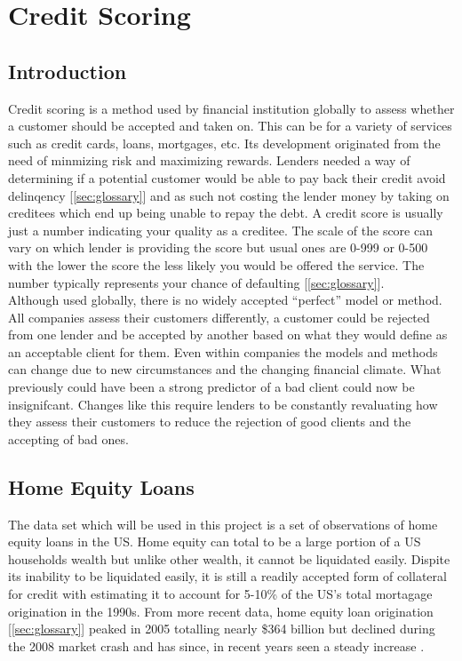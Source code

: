 \chapter{Credit Scoring}

\section{Introduction}
Credit scoring is a method used by financial institution globally to assess whether a customer should be accepted and taken on. This can be for a variety of services such as credit cards, loans, mortgages, etc. Its development originated from the need of minmizing risk and maximizing rewards. Lenders needed a way of determining if a potential customer would be able to pay back their credit avoid delinqency [\ref{sec:glossary}] and as such not costing the lender money by taking on creditees which end up being unable to repay the debt. A credit score is usually just a number indicating your quality as a creditee. The scale of the score can vary on which lender is providing the score but usual ones are 0-999 or 0-500 with the lower the score the less likely you would be offered the service. The number typically represents your chance of defaulting [\ref{sec:glossary}]. \\

Although used globally, there is no widely accepted ``perfect'' model or method. All companies assess their customers differently, a customer could be rejected from one lender and be accepted by another based on what they would define as an acceptable client for them. Even within companies the models and methods can change due to new circumstances and the changing financial climate. What previously could have been a strong predictor of a bad client could now be insignifcant. Changes like this require lenders to be constantly revaluating how they assess their customers to reduce the rejection of good clients and the accepting of bad ones.

\section{Home Equity Loans}
The data set which will be used in this project is a set of observations of home equity loans in the US. Home equity can total to be a large portion of a US households wealth but unlike other wealth, it cannot be liquidated easily. Dispite its inability to be liquidated easily, it is still a readily accepted form of collateral for credit \parencite{canner1998recent} with \parencite{weicher1997home} estimating it to account for 5-10\% of the US's total mortagage origination in the 1990s. From more recent data, home equity loan origination [\ref{sec:glossary}] peaked in 2005 totalling nearly \$364 billion but declined during the 2008 market crash and has since, in recent years seen a steady increase \parencite{corelogic2016home}. \\

